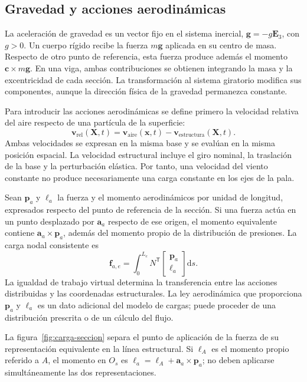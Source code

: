 \documentclass[11pt,a4paper,oneside]{report}
\newcommand{\vct}[1]{\bm{#1}}
\newcommand{\dd}{\mathrm d}
\newcommand{\tr}{\mathsf T}
\begin{document}
\subsection{Gravedad y acciones aerodinámicas}
La aceleración de gravedad es un vector fijo en el sistema inercial,
$\vct g=-g\vct E_3$, con $g>0$. Un cuerpo rígido recibe la fuerza $m\vct g$ aplicada en su centro de masa. Respecto de otro punto de referencia, esta fuerza produce además el momento $\vct c\times m\vct g$. En una viga, ambas contribuciones se obtienen integrando la masa y la excentricidad de cada sección. La transformación al sistema giratorio modifica sus componentes, aunque la dirección física de la gravedad permanezca constante.

Para introducir las acciones aerodinámicas se define primero la velocidad relativa del aire respecto de una partícula de la superficie:
\begin{equation}
 \vct v_{\mathrm{rel}}(\vct X,t)
 =\vct v_{\mathrm{aire}}(\vct x,t)-\vct v_{\mathrm{estructura}}(\vct X,t).
 \label{eq:velocidad-relativa-aire}
\end{equation}
Ambas velocidades se expresan en la misma base y se evalúan en la misma posición espacial. La velocidad estructural incluye el giro nominal, la traslación de la base y la perturbación elástica. Por tanto, una velocidad del viento constante no produce necesariamente una carga constante en los ejes de la pala.

Sean $\vct p_a$ y $\vct\ell_a$ la fuerza y el momento aerodinámicos por unidad de longitud, expresados respecto del punto de referencia de la sección. Si una fuerza actúa en un punto desplazado por $\vct a_a$ respecto de ese origen, el momento equivalente contiene $\vct a_a\times\vct p_a$, además del momento propio de la distribución de presiones. La carga nodal consistente es
\begin{equation}
 \vct f_{a,e}
 =\int_0^{L_e}N^\tr
 \begin{bmatrix}\vct p_a\\\vct\ell_a\end{bmatrix}\dd s.
 \label{eq:viento-consistente}
\end{equation}
La igualdad de trabajo virtual determina la transferencia entre las acciones distribuidas y las coordenadas estructurales. La ley aerodinámica que proporciona $\vct p_a$ y $\vct\ell_a$ es un dato adicional del modelo de cargas; puede proceder de una distribución prescrita o de un cálculo del flujo.

La figura~\ref{fig:carga-seccion} separa el punto de aplicación de la fuerza de su representación equivalente en la línea estructural. Si $\vct\ell_A$ es el momento propio referido a $A$, el momento en $O_s$ es $\vct\ell_a=\vct\ell_A+\vct a_a\times\vct p_a$; no deben aplicarse simultáneamente las dos representaciones.
\end{document}
